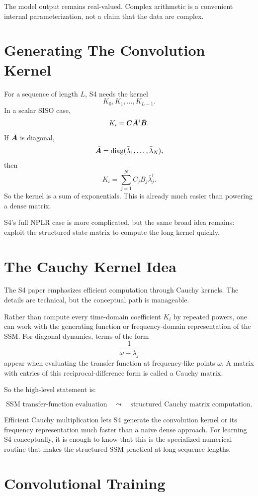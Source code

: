 The model output remains real-valued. Complex arithmetic is a convenient internal
parameterization, not a claim that the data are complex.

\section{Generating The Convolution Kernel}

For a sequence of length $L$, S4 needs the kernel
\[
  K_0,K_1,\ldots,K_{L-1}.
\]
In a scalar SISO case,
\[
  K_i = \bm{C}\bar{\bm{A}}^i\bar{\bm{B}}.
\]
If $\bar{\bm{A}}$ is diagonal,
\[
  \bar{\bm{A}} = \operatorname{diag}(\bar{\lambda}_1,\ldots,\bar{\lambda}_N),
\]
then
\[
  K_i
  =
  \sum_{j=1}^{N}
  C_j B_j \bar{\lambda}_j^i.
\]
So the kernel is a sum of exponentials. This is already much easier than powering a dense
matrix.

S4's full NPLR case is more complicated, but the same broad idea remains: exploit the
structured state matrix to compute the long kernel quickly.

\section{The Cauchy Kernel Idea}

The S4 paper emphasizes efficient computation through Cauchy kernels. The details are
technical, but the conceptual path is manageable.

Rather than compute every time-domain coefficient $K_i$ by repeated powers, one can work
with the generating function or frequency-domain representation of the SSM. For diagonal
dynamics, terms of the form
\[
  \frac{1}{\omega - \lambda_j}
\]
appear when evaluating the transfer function at frequency-like points $\omega$. A matrix
with entries of this reciprocal-difference form is called a Cauchy matrix.

So the high-level statement is:

\[
  \text{SSM transfer-function evaluation}
  \quad \leadsto \quad
  \text{structured Cauchy matrix computation}.
\]

Efficient Cauchy multiplication lets S4 generate the convolution kernel or its frequency
representation much faster than a naive dense approach. For learning S4 conceptually, it
is enough to know that this is the specialized numerical routine that makes the structured
SSM practical at long sequence lengths.

\section{Convolutional Training}

